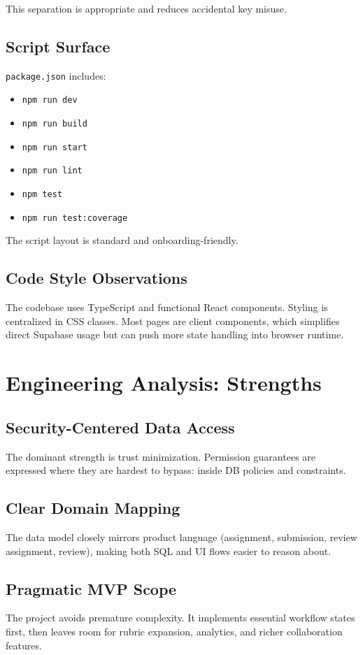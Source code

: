 \documentclass[11pt]{article}
\begin{document}
This separation is appropriate and reduces accidental key misuse.

\subsection{Script Surface}
\texttt{package.json} includes:
\begin{itemize}[leftmargin=*]
  \item \texttt{npm run dev}
  \item \texttt{npm run build}
  \item \texttt{npm run start}
  \item \texttt{npm run lint}
  \item \texttt{npm test}
  \item \texttt{npm run test:coverage}
\end{itemize}

The script layout is standard and onboarding-friendly.

\subsection{Code Style Observations}
The codebase uses TypeScript and functional React components. Styling is centralized in CSS classes. Most pages are client components, which simplifies direct Supabase usage but can push more state handling into browser runtime.

\section{Engineering Analysis: Strengths}
\subsection{Security-Centered Data Access}
The dominant strength is trust minimization. Permission guarantees are expressed where they are hardest to bypass: inside DB policies and constraints.

\subsection{Clear Domain Mapping}
The data model closely mirrors product language (assignment, submission, review assignment, review), making both SQL and UI flows easier to reason about.

\subsection{Pragmatic MVP Scope}
The project avoids premature complexity. It implements essential workflow states first, then leaves room for rubric expansion, analytics, and richer collaboration features.
\end{document}
